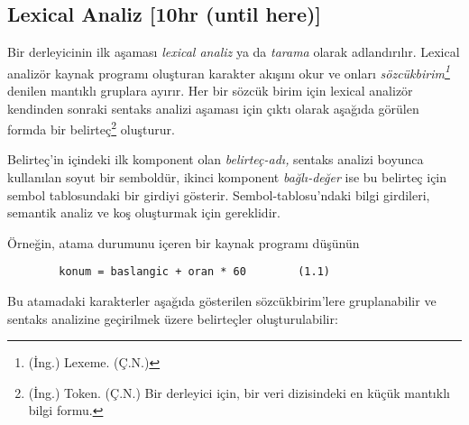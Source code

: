 \subsection{Lexical Analiz [10hr (until here)]}

\setcounter{footnote}{0}

Bir derleyicinin ilk aşaması \textit{lexical analiz} ya da \textit{tarama} olarak adlandırılır. Lexical analizör kaynak programı oluşturan karakter akışını okur ve onları \textit{sözcükbirim\footnote{(İng.) Lexeme. (Ç.N.)}} denilen mantıklı gruplara ayırır. Her bir sözcük birim için lexical analizör kendinden sonraki sentaks analizi aşaması için çıktı olarak aşağıda görülen formda bir belirteç\footnote{(İng.) Token. (Ç.N.) Bir derleyici için, bir veri dizisindeki en küçük mantıklı bilgi formu.} oluşturur.

{}


Belirteç'in içindeki ilk komponent olan \textit{belirteç-adı,} sentaks analizi boyunca kullanılan soyut bir semboldür, ikinci komponent \textit{bağlı-değer} ise bu belirteç için sembol tablosundaki bir girdiyi gösterir. Sembol-tablosu'ndaki bilgi girdileri, semantik analiz ve koş oluşturmak için gereklidir.

Örneğin, atama durumunu içeren bir kaynak programı düşünün

\begin{lstlisting}
 		konum = baslangic + oran * 60        (1.1)
\end{lstlisting}

Bu atamadaki karakterler aşağıda gösterilen sözcükbirim'lere gruplanabilir ve sentaks analizine geçirilmek üzere belirteçler oluşturulabilir:

